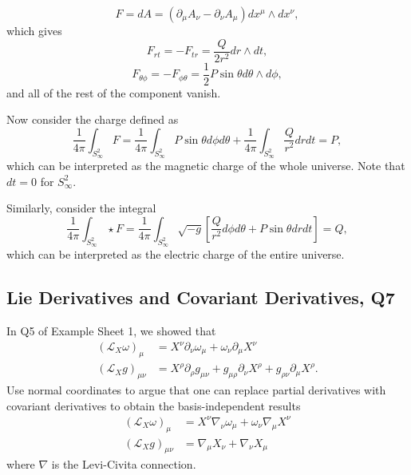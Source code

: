 \begin{solution}
\begin{equation}
    F = dA = (\partial_\mu A_\nu - \partial_\nu A_\mu)dx^\mu \wedge dx ^\nu,
\end{equation}
which gives
\begin{equation}
    F_{rt} = -F_{tr} = \frac{Q}{2r^2} dr \wedge dt,
\end{equation}
\begin{equation}
    F_{\theta\phi} = -F_{\phi\theta} = \frac{1}{2}P\sin\theta d\theta\wedge d\phi,
\end{equation}
and all of the rest of the component vanish.

Now consider the charge defined as
\begin{equation}
    \frac{1}{4\pi}\int_{S_\infty^2} F = \frac{1}{4\pi}\int_{S_\infty^2}P\sin\theta d\phi d\theta + \frac{1}{4\pi}\int_{S_\infty^2}\frac{Q}{r^2} dr dt= P,
\end{equation}
which can be interpreted as the magnetic charge of the whole universe. Note that $dt =0$ for $S_\infty^2$.

Similarly, consider the integral
\begin{equation}
    \frac{1}{4\pi}\int_{S^2_\infty} \star F = \frac{1}{4\pi}\int_{S^2_\infty} \sqrt{-g}\left[\frac{Q}{r^2}d\phi d\theta + P\sin\theta dr dt\right] =Q,
\end{equation}
which can be interpreted as the electric charge of the entire universe.

\end{solution}
\subsection{Lie Derivatives and Covariant Derivatives, Q7}

In Q5 of Example Sheet 1, we showed that
\begin{align*}
    (\mathcal{L}_X\omega)_\mu &= X^\nu\partial_\nu\omega_\mu + \omega_\nu\partial_\mu X^\nu\\
    (\mathcal{L}_X g)_{\mu\nu} &= X^\rho\partial_\rho g_{\mu\nu} + g_{\mu\rho}\partial_\nu X^\rho + g_{\rho\nu}\partial_\mu X^\rho.
\end{align*}
Use normal coordinates to argue that one can replace partial derivatives with covariant derivatives to obtain the basis-independent results
\begin{align*}
    (\mathcal{L}_X\omega)_\mu &= X^\nu\nabla_\nu\omega_\mu + \omega_\nu\nabla_\mu X^\nu\\
    (\mathcal{L}_X g)_{\mu\nu} &= \nabla_\mu X_\nu + \nabla_\nu X_\mu
\end{align*}
where $\nabla$ is the Levi-Civita connection.

